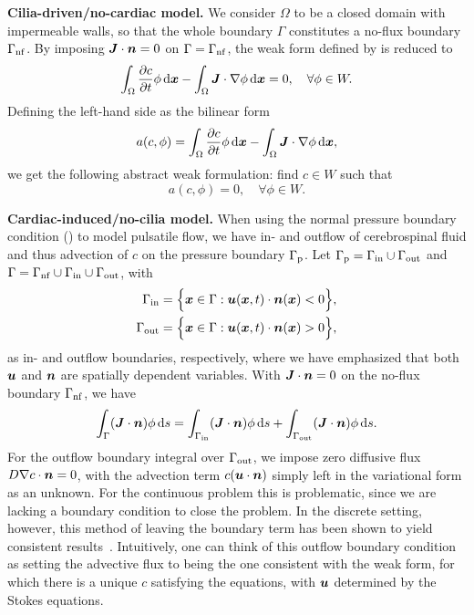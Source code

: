 \documentclass{WileyMSP-template}
\begin{document}
\textbf{Cilia-driven/no-cardiac model.} We consider $\Omega$ to be
a closed domain with impermeable walls, so that the whole boundary
$\Gamma$ constitutes a no-flux boundary $\Gamma_{\mathrm{nf}}$.
By imposing $\bm{J}\cdot\bm{n}=0$ on $\Gamma=\Gamma_{\mathrm{nf}}$, 
the weak form defined by  is reduced to
\begin{equation*}
    \int_{\Omega}\frac{\partial c}{\partial t}\phi \, \mathrm d\bm{x} - \int_{\Omega}\bm{J}\cdot\nabla\phi \, \mathrm d\bm{x} = 0, \quad\forall\phi\in W.
\end{equation*}
Defining the left-hand side as the bilinear form
\begin{equation*}
    a(c, \phi) = \int_{\Omega}\frac{\partial c}{\partial t}\phi \, \mathrm d\bm{x} - \int_{\Omega}\bm{J}\cdot\nabla\phi \, \mathrm d\bm{x}, 
\end{equation*}
we get the following abstract weak formulation: find $c\in W$ such that
\begin{equation*}
    a(c, \phi) = 0, \quad\forall\phi\in W.
\end{equation*}

\textbf{Cardiac-induced/no-cilia model.} When using the normal pressure
boundary condition () to model pulsatile flow,
we have in- and outflow of cerebrospinal fluid and thus advection of
$c$ on the pressure boundary $\Gamma_{\mathrm{p}}$.
Let $\Gamma_{\mathrm{p}}=\Gamma_{\mathrm{in}}\cup\Gamma_{\mathrm{out}}$ and $\Gamma = \Gamma_{\mathrm{nf}}\cup\Gamma_{\mathrm{in}}\cup\Gamma_{\mathrm{out}}$, with 
\begin{align*}
    \Gamma_{\mathrm{in}}  &= \Big\{\bm{x}\in\Gamma : \bm{u}(\bm{x}, t)\cdot\bm{n}(\bm{x}) < 0 \Big\}, \\
    \Gamma_{\mathrm{out}} &= \Big\{\bm{x}\in\Gamma : \bm{u}(\bm{x}, t)\cdot\bm{n}(\bm{x}) > 0 \Big\},
\end{align*}
as in- and outflow boundaries, respectively, where we have emphasized that
both $\bm{u}$ and $\bm{n}$ are spatially dependent variables.
With $\bm{J}\cdot\bm{n}=0$ on the no-flux boundary $\Gamma_{\mathrm{nf}}$, we have
\begin{equation*}
    \int_{\Gamma}(\bm{J}\cdot\bm{n})\phi \, \mathrm ds = \int_{\Gamma_{\mathrm{in}}}(\bm{J}\cdot\bm{n})\phi \, \mathrm ds + \int_{\Gamma_{\mathrm{out}}}(\bm{J}\cdot\bm{n})\phi \, \mathrm ds. 
\end{equation*}
For the outflow boundary integral over $\Gamma_{\mathrm{out}}$, we impose zero
diffusive flux $D\nabla c\cdot\bm{n}=0$,
with the advection term $c(\bm{u}\cdot\bm{n})$ simply left in the variational form as an unknown.
For the continuous problem this is problematic, since we are lacking a boundary
condition to close the problem. 
In the discrete setting, however, this method of leaving the boundary term has been shown
to yield consistent results~\cite{Papanastasiou1992ACondition, Lynch2020NumericalHemodynamics,
Griffiths1997TheCondition}. Intuitively, one can think of this outflow boundary condition as
setting the advective flux to being the one consistent with the weak form,
for which there is a unique $c$ satisfying the equations, with $\bm{u}$ determined by
the Stokes equations. 
\end{document}
